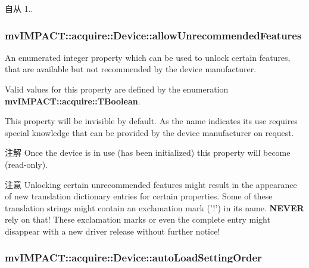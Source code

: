 \begin{DoxySince}{自从}
1.. 
\end{DoxySince}
\hypertarget{classmv_i_m_p_a_c_t_1_1acquire_1_1_device_a1cce00cf697d950dace425bcc7a61b82}{
\subsubsection[{allow\+Unrecommended\+Features}]{ mv\+I\+M\+P\+A\+C\+T\+::acquire\+::\+Device\+::allow\+Unrecommended\+Features}}\label{classmv_i_m_p_a_c_t_1_1acquire_1_1_device_a1cce00cf697d950dace425bcc7a61b82}


An enumerated integer property which can be used to unlock certain features, that are available but not recommended by the device manufacturer. 

Valid values for this property are defined by the enumeration {\bfseries mv\+I\+M\+P\+A\+C\+T\+::acquire\+::\+T\+Boolean}.

This property will be invisible by default. As the name indicates its use requires special knowledge that can be provided by the device manufacturer on request.

\begin{DoxyNote}{注解}
Once the device is in use (has been initialized) this property will become {\bfseries }(read-\/only).
\end{DoxyNote}
\begin{DoxyAttention}{注意}
Unlocking certain unrecommended features might result in the appearance of new translation dictionary entries for certain properties. Some of these translation strings might contain an exclamation mark ('!') in its name. {\bfseries N\+E\+V\+E\+R} rely on that! These exclamation marks or even the complete entry might disappear with a new driver release without further notice! 
\end{DoxyAttention}
\hypertarget{classmv_i_m_p_a_c_t_1_1acquire_1_1_device_a3130a245e1dc22be91511ce6a6bdf957}{
\subsubsection[{auto\+Load\+Setting\+Order}]{ mv\+I\+M\+P\+A\+C\+T\+::acquire\+::\+Device\+::auto\+Load\+Setting\+Order}}\label{classmv_i_m_p_a_c_t_1_1acquire_1_1_device_a3130a245e1dc22be91511ce6a6bdf957}


